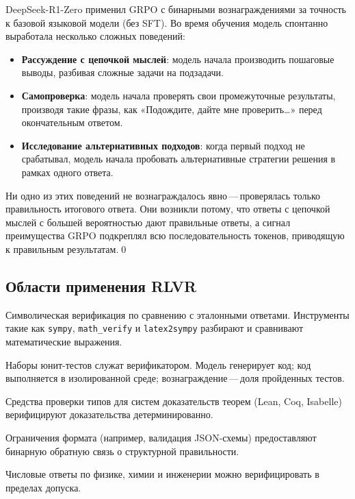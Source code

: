 \begin{example}
\label{ex:r1-zero}
DeepSeek-R1-Zero применил GRPO с бинарными вознаграждениями за точность к базовой языковой модели (без SFT). Во время обучения модель спонтанно выработала несколько сложных поведений:
\begin{itemize}[leftmargin=*]
  \item \textbf{Рассуждение с цепочкой мыслей}: модель начала производить пошаговые выводы, разбивая сложные задачи на подзадачи.
  \item \textbf{Самопроверка}: модель начала проверять свои промежуточные результаты, производя такие фразы, как «Подождите, дайте мне проверить\ldots» перед окончательным ответом.
  \item \textbf{Исследование альтернативных подходов}: когда первый подход не срабатывал, модель начала пробовать альтернативные стратегии решения в рамках одного ответа.
\end{itemize}
Ни одно из этих поведений не вознаграждалось явно\,---\,проверялась только правильность итогового ответа. Они возникли потому, что ответы с цепочкой мыслей с большей вероятностью дают правильные ответы, а сигнал преимущества GRPO подкреплял всю последовательность токенов, приводящую к правильным результатам.\qed
\end{example}

\subsection{Области применения RLVR}

\begin{description}[leftmargin=!,labelwidth=3.5cm,align=parleft]
  \item[Математика] Символическая верификация по сравнению с эталонными ответами. Инструменты такие как \texttt{sympy}, \texttt{math\_verify} и \texttt{latex2sympy} разбирают и сравнивают математические выражения.
  \item[Генерация кода] Наборы юнит-тестов служат верификатором. Модель генерирует код; код выполняется в изолированной среде; вознаграждение\,---\,доля пройденных тестов.
  \item[Формальные доказательства] Средства проверки типов для систем доказательств теорем (Lean, Coq, Isabelle) верифицируют доказательства детерминированно.
  \item[Генерация с ограничениями] Ограничения формата (например, валидация JSON-схемы) предоставляют бинарную обратную связь о структурной правильности.
  \item[Естественные науки] Числовые ответы по физике, химии и инженерии можно верифицировать в пределах допуска.
\end{description}

